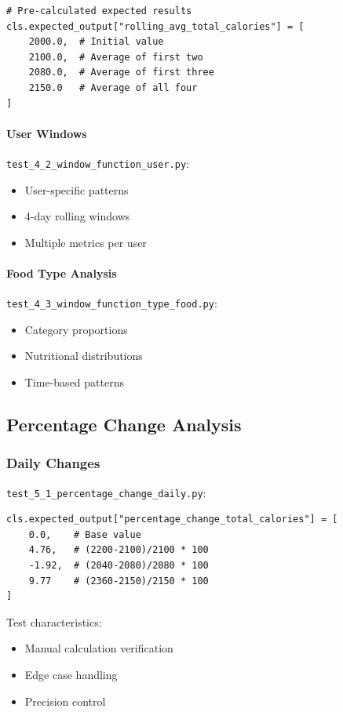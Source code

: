 \begin{lstlisting}[style=pythonstyle, caption=Window Function Test]
# Pre-calculated expected results
cls.expected_output["rolling_avg_total_calories"] = [
    2000.0,  # Initial value
    2100.0,  # Average of first two
    2080.0,  # Average of first three
    2150.0   # Average of all four
]
\end{lstlisting}

\paragraph{User Windows} \texttt{test\_4\_2\_window\_function\_user.py}:
\begin{itemize}
    \item User-specific patterns
    \item 4-day rolling windows
    \item Multiple metrics per user
\end{itemize}

\paragraph{Food Type Analysis} \texttt{test\_4\_3\_window\_function\_type\_food.py}:
\begin{itemize}
    \item Category proportions
    \item Nutritional distributions
    \item Time-based patterns
\end{itemize}

\subsection{Percentage Change Analysis}

\subsubsection{Daily Changes}
\texttt{test\_5\_1\_percentage\_change\_daily.py}:

\begin{lstlisting}[style=pythonstyle, caption=Percentage Change Test]
cls.expected_output["percentage_change_total_calories"] = [
    0.0,    # Base value
    4.76,   # (2200-2100)/2100 * 100
    -1.92,  # (2040-2080)/2080 * 100
    9.77    # (2360-2150)/2150 * 100
]
\end{lstlisting}

Test characteristics:
\begin{itemize}
    \item Manual calculation verification
    \item Edge case handling
    \item Precision control
\end{itemize}

